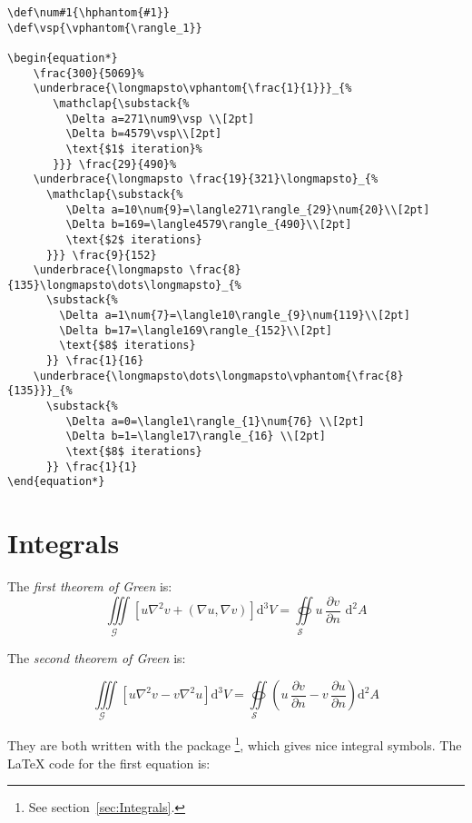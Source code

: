 \begin{table}[htb]
\begin{lstlisting}
\def\num#1{\hphantom{#1}}
\def\vsp{\vphantom{\rangle_1}}

\begin{equation*}
    \frac{300}{5069}%
    \underbrace{\longmapsto\vphantom{\frac{1}{1}}}_{%
	   \mathclap{\substack{%
	     \Delta a=271\num9\vsp \\[2pt]
	     \Delta b=4579\vsp\\[2pt]
	     \text{$1$ iteration}%
	   }}} \frac{29}{490}%
	\underbrace{\longmapsto \frac{19}{321}\longmapsto}_{%
      \mathclap{\substack{%
	     \Delta a=10\num{9}=\langle271\rangle_{29}\num{20}\\[2pt]
         \Delta b=169=\langle4579\rangle_{490}\\[2pt]
         \text{$2$ iterations}
      }}} \frac{9}{152}
    \underbrace{\longmapsto \frac{8}{135}\longmapsto\dots\longmapsto}_{%
      \substack{%
	    \Delta a=1\num{7}=\langle10\rangle_{9}\num{119}\\[2pt]
	    \Delta b=17=\langle169\rangle_{152}\\[2pt]
	    \text{$8$ iterations}
      }} \frac{1}{16}
    \underbrace{\longmapsto\dots\longmapsto\vphantom{\frac{8}{135}}}_{%
      \substack{%
	     \Delta a=0=\langle1\rangle_{1}\num{76} \\[2pt]
	     \Delta b=1=\langle17\rangle_{16} \\[2pt]
         \text{$8$ iterations}
      }} \frac{1}{1}
\end{equation*}
\end{lstlisting}


\section{Integrals}\label{sec:Integrals}
\def\Q#1#2{\frac{\partial #1}{\partial #2}}
%
The \emph{first theorem of Green} is:
\[
\underset{\mathcal{G}\quad}\iiint\!%
	\left[u\nabla^{2}v+\left(\nabla u,\nabla v\right)\right]\mathrm{d}^{3}V%
	=\underset{\mathcal{S}\quad}\oiint u\,\Q{v}{n}\,\,\mathrm{d}^{2}A
\]

The \emph{second theorem of Green} is:

\[
\underset{{\mathcal{G}\quad}}\iiint\!%
	\left[u\nabla^{2}v-v\nabla^{2}u\right]\mathrm{d}^{3}V%
	=\underset{\mathcal{S}\quad}\oiint%
	\left(u\,\Q{v}{n}-v\,\Q{u}{n}\right)\mathrm{d}^{2}A
\]


They are both written with the  package%
\footnote{See section~\vref{sec:Integrals}.}, which gives nice integral symbols.  
The \LaTeX{} code for the first equation is:


\end{table}
